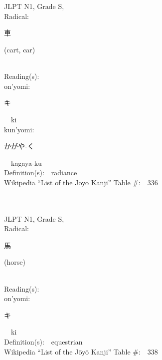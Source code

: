 \begin{multicols}{2}
\ \ \\
{\fontsize{34pt}{40pt}  }\ \ \\
{JLPT N1, Grade S, \\Radical:\ \ {\begin{CJK}{UTF8}{min} 車 \end{CJK}} (cart, car) } \\
Reading(s):\ \ \\
{\hspace*{1em}}on'yomi:\ \ \\
{\hspace*{2em}}{\begin{CJK}{UTF8}{min} キ \end{CJK}}\ \ ki\ \ \\
{\hspace*{1em}}kun'yomi:\ \ \\
{\hspace*{2em}}{\begin{CJK}{UTF8}{min} かがや-く \end{CJK}}\ \ kagaya-ku\ \ \\
Definition(s):\ \ radiance \\
Wikipedia ``List of the J\=oy\=o Kanji'' Table \#:\ \ 336 \\
\ \ \\
{\fontsize{34pt}{40pt}  }\ \ \\
{JLPT N1, Grade S, \\Radical:\ \ {\begin{CJK}{UTF8}{min} 馬 \end{CJK}} (horse) } \\
Reading(s):\ \ \\
{\hspace*{1em}}on'yomi:\ \ \\
{\hspace*{2em}}{\begin{CJK}{UTF8}{min} キ \end{CJK}}\ \ ki\ \ \\
Definition(s):\ \ equestrian \\
Wikipedia ``List of the J\=oy\=o Kanji'' Table \#:\ \ 338 \\
\ \ \\
{\fontsize{34pt}{40pt}  }\ \ \\

\end{multicols}
